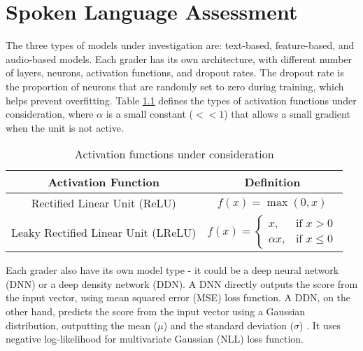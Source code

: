 \chapter{Spoken Language Assessment} \label{chap:graders}

The three types of models under investigation are: text-based, feature-based, and audio-based models. Each grader has its own architecture, with different number of layers, neurons, activation functions, and dropout rates. The dropout rate is the proportion of neurons that are randomly set to zero during training, which helps prevent overfitting. Table \ref{activation functions} defines the types of activation functions under consideration, where $\alpha$ is a small constant ($<<1$) that allows a small gradient when the unit is not active.

\begin{table}[H]
    \centering
    \begin{tabular}{|c|c|}
        \hline
        \textbf{Activation Function}                                                             & \textbf{Definition}                     \\ \hline
        Rectified Linear Unit (ReLU) \nomenclature[Z]{ReLU}{Rectified Linear Unit}               & $f(x) = \max(0, x)$                     \\ \hline
        Leaky Rectified Linear Unit (LReLU) \nomenclature[Z]{LReLU}{Leaky Rectified Linear Unit} & $f(x) = \begin{cases}
                                                                                                                   x,        & \text{if } x > 0    \\
                                                                                                                   \alpha x, & \text{if } x \leq 0
                                                                                                               \end{cases}$ \\ \hline
    \end{tabular}
    \caption{Activation functions under consideration}
    \label{activation functions}
\end{table}

Each grader also have its own model type - it could be a deep neural network (DNN)  or a deep density network (DDN). A DNN directly outputs the score from the input vector, using mean squared error (MSE)  loss function. A DDN, on the other hand, predicts the score from the input vector using a Gaussian distribution, outputting the mean ($\mu$)  and the standard deviation ($\sigma$) . It uses negative log-likelihood for multivariate Gaussian (NLL)  loss function.

